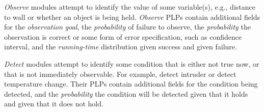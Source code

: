 \documentclass[letterpaper]{article}
\newcommand\commentout[1]{}
\begin{document}
\commentout{
Sometimes, one needs to maintain some condition in order to achieve a goal. For example, one may reach a 
target position by maintaining a pre-computed path to the goal, either by iteratively reaching way-points,
or by ensuring that the heading is always in the direction of the path. One can model this behaviour using an achieve module
whose goal is to reach the target position, or as a maintain module that maintains heading along the path direction,
with the success termination condition being ``at-the-goal". The latter definition is less abstract, and clarifies what the module actually needs
to do. Given this definition, we can detect problems by alerting the operator or system whenever the actual heading is not in the direction of the path, rather than only when the goal is not reached. Of course, ultimately, the user decides which model suits her best.
}


{\em Observe\/} modules attempt to identify the value of some variable(s),
e.g., distance to wall or whether an object is being held. 
{\em Observe} PLPs contain additional fields for the \textit{observation goal}, the \textit{probability} of failure to observe, the \textit{probability} 
the observation is correct or some form of error specification, such as confidence interval,
and the \textit{running-time} distribution given success and given failure.

{\em Detect\/} modules attempt to identify some condition that is either not true now, or that is not immediately observable.
For example, detect intruder or detect temperature change. Their PLPs contain additional fields
for the condition being detected, and the \textit{probability} the condition will be detected given
that it holds 
and given that it does not hold.
\end{document}
